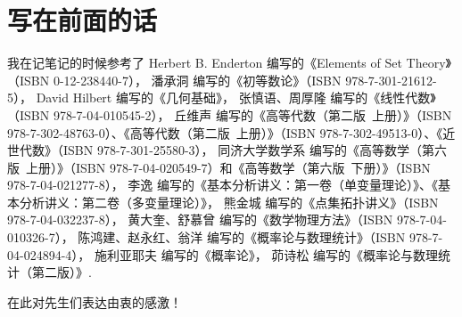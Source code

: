 \documentclass[UTF8,12pt]{ctexbook}
\title{\pdftitle}
\author{\pdfauthor}
\date{
Powered by \TeX \\
\today
}
\begin{document}


\chapter*{写在前面的话}
我在记笔记的时候参考了%
Herbert B. Enderton 编写的《Elements of Set Theory》（ISBN 0-12-238440-7），%
潘承洞 编写的《初等数论》（ISBN 978-7-301-21612-5），%
David Hilbert 编写的《几何基础》，%
张慎语、周厚隆 编写的《线性代数》（ISBN 978-7-04-010545-2），%
丘维声 编写的《高等代数（第二版\ 上册）》（ISBN 978-7-302-48763-0）、《高等代数（第二版\ 上册）》（ISBN 978-7-302-49513-0）、《近世代数》（ISBN 978-7-301-25580-3），%
同济大学数学系 编写的《高等数学（第六版\ 上册）》（ISBN 978-7-04-020549-7）和《高等数学（第六版\ 下册）》（ISBN 978-7-04-021277-8），%
李逸 编写的《基本分析讲义：第一卷（单变量理论）》、《基本分析讲义：第二卷（多变量理论）》，%
熊金城 编写的《点集拓扑讲义》（ISBN 978-7-04-032237-8），%
黄大奎、舒慕曾 编写的《数学物理方法》（ISBN 978-7-04-010326-7），%
陈鸿建、赵永红、翁洋 编写的《概率论与数理统计》（ISBN 978-7-04-024894-4），%
施利亚耶夫 编写的《概率论》，%
茆诗松 编写的《概率论与数理统计（第二版）》.

在此对先生们表达由衷的感激！

\frontmatter
{} %
\tableofcontents

\mainmatter
{} %

\let\oldchapter\chapter
\renewcommand\chapter{\cleardoublepage\oldchapter}
\let\oldsection\section
\renewcommand\section{\clearpage\oldsection}

\everymath{\displaystyle}

\renewcommand{\v}[3][1]{%
\begingroup%
\ifnum0<0#3\relax{%
  \setcounter{enumi}{#1}%
  {#2}_{\theenumi}%
  \stepcounter{enumi}%
  \whileboolexpr{not test{\ifnumcomp{\value{enumi}}>{#3}}}%
  {%
    ,\allowbreak{#2}_{\theenumi}%
    \stepcounter{enumi}%
  }%
}\else%
  \ifx#30\relax%
    {#2}_{#1},\allowbreak{#2}_{\number\numexpr#1+1},\allowbreak\dotsc
  \else
    {#2}_{#1},\allowbreak{#2}_{\number\numexpr#1+1},\allowbreak\dotsc,\allowbreak{#2}_{#3}%
  \fi
\fi\endgroup%
}%










\backmatter

\end{document}
